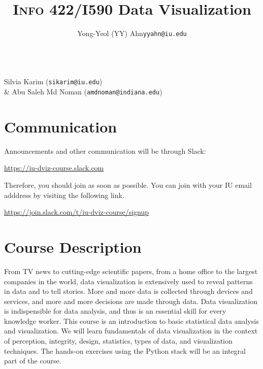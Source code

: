 \documentclass[11pt,article,oneside]{memoir} %
\makeatletter
\def\myauthor{Author}
\def\mytitle{Title}
\def\myemail{yyahn@iu.edu}
\def\myauthor{Yong-Yeol (YY) Ahn}
\def\mytitle{{\normalsize \textsc{Info} 422/I590 \newline} \HUGE Data Visualization}
\makeatother
\begin{document}

\title{\LARGE \mytitle} %
\author{\Large\myauthor \newline \footnotesize\texttt{\noindent\myemail}}

\maketitle 

\vspace{-20pt}{\bfseries Assistant Instructors} \\ Silvia Karim (\texttt{sikarim@iu.edu})  \\ &
Abu Saleh Md Noman (\texttt{amdnoman@indiana.edu}) 
\section{Communication} %

Announcements and other communication will be through Slack: 

\url{https://iu-dviz-course.slack.com}

Therefore, you should join as soon as possible. You can join with your IU email adddress by visiting the following link. 

\url{https://join.slack.com/t/iu-dviz-course/signup}

\section{Course Description}%

From TV news to cutting-edge scientific papers, from a home office to the
largest companies in the world, data visualization is extensively used to
reveal patterns in data and to tell stories. More and more data is collected
through devices and services, and more and more decisions are made through
data. Data visualization is indispensible for data analysis, and thus is an
essential skill for every knowledge worker.  This course is an introduction to
basic statistical data analysis and visualization.  We will learn fundamentals
of data visualization in the context of perception, integrity, design,
statistics, types of data, and visualization techniques.  The hands-on
exercises using the Python stack will be an integral part of the course. 
\end{document}
